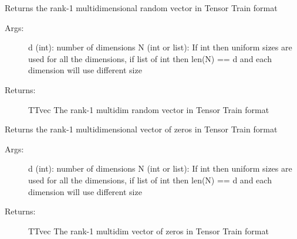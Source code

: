 \documentclass[a4paper,10pt,english]{sphinxmanual}
\begin{document}

\begin{fulllineitems}
\label{api-core:TensorToolbox.core.randvec}
Returns the rank-1 multidimensional random vector in Tensor Train format
\begin{description}
\item[{Args:}] \leavevmode
d (int): number of dimensions
N (int or list): If int then uniform sizes are used for all the dimensions, if list of int then len(N) == d and each dimension will use different size

\item[{Returns:}] \leavevmode
TTvec The rank-1 multidim random vector in Tensor Train format

\end{description}

\end{fulllineitems}


\begin{fulllineitems}
\label{api-core:TensorToolbox.core.zerosvec}
Returns the rank-1 multidimensional vector of zeros in Tensor Train format
\begin{description}
\item[{Args:}] \leavevmode
d (int): number of dimensions
N (int or list): If int then uniform sizes are used for all the dimensions, if list of int then len(N) == d and each dimension will use different size

\item[{Returns:}] \leavevmode
TTvec The rank-1 multidim vector of zeros in Tensor Train format

\end{description}

\end{fulllineitems}

\end{document}

